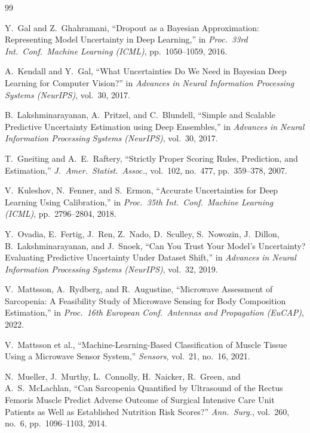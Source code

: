 \documentclass[12pt, a4paper, oneside]{report}
\begin{document}

\begin{thebibliography}{99}

Y.~Gal and Z.~Ghahramani,
``Dropout as a Bayesian Approximation: Representing Model Uncertainty in Deep Learning,''
in \emph{Proc.\ 33rd Int.\ Conf.\ Machine Learning (ICML)}, pp.~1050--1059, 2016.

A.~Kendall and Y.~Gal,
``What Uncertainties Do We Need in Bayesian Deep Learning for Computer Vision?''
in \emph{Advances in Neural Information Processing Systems (NeurIPS)}, vol.~30, 2017.

B.~Lakshminarayanan, A.~Pritzel, and C.~Blundell,
``Simple and Scalable Predictive Uncertainty Estimation using Deep Ensembles,''
in \emph{Advances in Neural Information Processing Systems (NeurIPS)}, vol.~30, 2017.

T.~Gneiting and A.~E.~Raftery,
``Strictly Proper Scoring Rules, Prediction, and Estimation,''
\emph{J.\ Amer.\ Statist.\ Assoc.}, vol.~102, no.~477, pp.~359--378, 2007.

V.~Kuleshov, N.~Fenner, and S.~Ermon,
``Accurate Uncertainties for Deep Learning Using Calibration,''
in \emph{Proc.\ 35th Int.\ Conf.\ Machine Learning (ICML)}, pp.~2796--2804, 2018.

Y.~Ovadia, E.~Fertig, J.~Ren, Z.~Nado, D.~Sculley, S.~Nowozin, J.~Dillon, B.~Lakshminarayanan, and J.~Snoek,
``Can You Trust Your Model's Uncertainty? Evaluating Predictive Uncertainty Under Dataset Shift,''
in \emph{Advances in Neural Information Processing Systems (NeurIPS)}, vol.~32, 2019.

V.~Mattsson, A.~Rydberg, and R.~Augustine,
``Microwave Assessment of Sarcopenia: A Feasibility Study of Microwave Sensing for Body Composition Estimation,''
in \emph{Proc.\ 16th European Conf.\ Antennas and Propagation (EuCAP)}, 2022.

V.~Mattsson et al.,
``Machine-Learning-Based Classification of Muscle Tissue Using a Microwave Sensor System,''
\emph{Sensors}, vol.~21, no.~16, 2021.

N.~Mueller, J.~Murthy, L.~Connolly, H.~Naicker, R.~Green, and A.~S.~McLachlan,
``Can Sarcopenia Quantified by Ultrasound of the Rectus Femoris Muscle Predict Adverse Outcome of Surgical Intensive Care Unit Patients as Well as Established Nutrition Risk Scores?''
\emph{Ann.\ Surg.}, vol.~260, no.~6, pp.~1096--1103, 2014.


\end{thebibliography}
\end{document}
